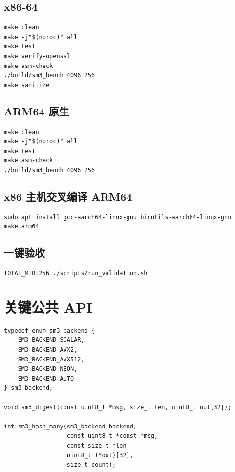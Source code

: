 \documentclass[UTF8,a4paper,12pt]{ctexart}
\begin{document}
\subsection{x86-64}
\begin{lstlisting}[style=shellstyle]
make clean
make -j"$(nproc)" all
make test
make verify-openssl
make asm-check
./build/sm3_bench 4096 256
make sanitize
\end{lstlisting}

\subsection{ARM64 原生}
\begin{lstlisting}[style=shellstyle]
make clean
make -j"$(nproc)" all
make test
make asm-check
./build/sm3_bench 4096 256
\end{lstlisting}

\subsection{x86 主机交叉编译 ARM64}
\begin{lstlisting}[style=shellstyle]
sudo apt install gcc-aarch64-linux-gnu binutils-aarch64-linux-gnu
make arm64
\end{lstlisting}

\subsection{一键验收}
\begin{lstlisting}[style=shellstyle]
TOTAL_MIB=256 ./scripts/run_validation.sh
\end{lstlisting}

\section{关键公共 API}
\begin{lstlisting}[style=cstyle]
typedef enum sm3_backend {
    SM3_BACKEND_SCALAR,
    SM3_BACKEND_AVX2,
    SM3_BACKEND_AVX512,
    SM3_BACKEND_NEON,
    SM3_BACKEND_AUTO
} sm3_backend;

void sm3_digest(const uint8_t *msg, size_t len, uint8_t out[32]);

int sm3_hash_many(sm3_backend backend,
                  const uint8_t *const *msg,
                  const size_t *len,
                  uint8_t (*out)[32],
                  size_t count);
\end{lstlisting}
\end{document}

